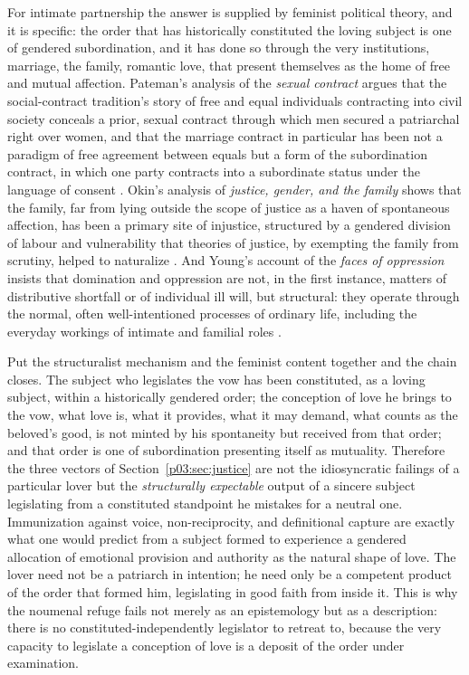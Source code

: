 \documentclass[11pt,a4paper]{article}
\begin{document}
For intimate partnership the answer is supplied by feminist political theory, and it is specific: the order that has historically constituted the loving subject is one of gendered subordination, and it has done so through the very institutions, marriage, the family, romantic love, that present themselves as the home of free and mutual affection. Pateman's analysis of the \emph{sexual contract} argues that the social-contract tradition's story of free and equal individuals contracting into civil society conceals a prior, sexual contract through which men secured a patriarchal right over women, and that the marriage contract in particular has been not a paradigm of free agreement between equals but a form of the subordination contract, in which one party contracts into a subordinate status under the language of consent \parencite{pateman1988sexual}. Okin's analysis of \emph{justice, gender, and the family} shows that the family, far from lying outside the scope of justice as a haven of spontaneous affection, has been a primary site of injustice, structured by a gendered division of labour and vulnerability that theories of justice, by exempting the family from scrutiny, helped to naturalize \parencite{okin1989justice}. And Young's account of the \emph{faces of oppression} insists that domination and oppression are not, in the first instance, matters of distributive shortfall or of individual ill will, but structural: they operate through the normal, often well-intentioned processes of ordinary life, including the everyday workings of intimate and familial roles \parencite{young1990justice}.

Put the structuralist mechanism and the feminist content together and the chain closes. The subject who legislates the vow has been constituted, as a loving subject, within a historically gendered order; the conception of love he brings to the vow, what love is, what it provides, what it may demand, what counts as the beloved's good, is not minted by his spontaneity but received from that order; and that order is one of subordination presenting itself as mutuality. Therefore the three vectors of Section~\ref{p03:sec:justice} are not the idiosyncratic failings of a particular lover but the \emph{structurally expectable} output of a sincere subject legislating from a constituted standpoint he mistakes for a neutral one. Immunization against voice, non-reciprocity, and definitional capture are exactly what one would predict from a subject formed to experience a gendered allocation of emotional provision and authority as the natural shape of love. The lover need not be a patriarch in intention; he need only be a competent product of the order that formed him, legislating in good faith from inside it. This is why the noumenal refuge fails not merely as an epistemology but as a description: there is no constituted-independently legislator to retreat to, because the very capacity to legislate a conception of love is a deposit of the order under examination.
\end{document}
